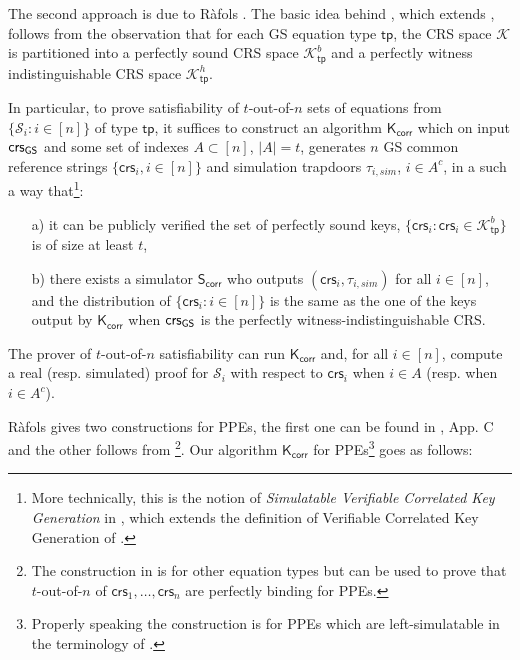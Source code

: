 The second approach is due to R\`afols \cite{TCC:Rafols15}. The basic idea behind \cite{TCC:Rafols15}, which extends \cite{C:GroOstSah06}, follows from the observation that for each GS equation type 
$\mathsf{tp}$,  the CRS space $\mathcal{K}$ is partitioned into a perfectly sound CRS space $\mathcal{K}^b_\mathsf{tp}$ and a perfectly witness indistinguishable CRS space $\mathcal{K}^{h}_\mathsf{tp}$.

In particular, to prove satisfiability of $t$-out-of-$n$ sets of equations from $\{\mathcal{S}_i:i\in[n]\}$ of type $\mathsf{tp}$, it suffices to construct an algorithm $\mathsf{K}_{\mathsf{corr}}$ which on input
$\mathsf{crs}_{{\mathsf{GS}}}$ and some set of indexes $A \subset [n]$, $|A|=t$, generates $n$ GS common reference strings 
$\{\mathsf{crs}_i, i \in [n]\}$ and simulation trapdoors $\tau_{i,sim}$, $i \in A^c$, in a such a way that\footnote{More technically, this is the notion of \textit{Simulatable Verifiable Correlated Key Generation} in \cite{TCC:Rafols15}, which extends the definition of Verifiable Correlated Key Generation of \cite{C:GroOstSah06}.}:
\begin{itemize}
\item[a)] it can be publicly verified the set of perfectly sound keys, 
$\{\mathsf{crs}_i : \mathsf{crs}_i \in \mathcal{K}_{\mathsf{tp}}^{b}\}$ is of size at least $t$,
\item [b)] there exists a simulator $\mathsf{S}_{\mathsf{corr}}$ who outputs $(\mathsf{crs}_i,\tau_{i,sim})$ for all $i \in [n]$, and the distribution of $\{\mathsf{crs}_i : i \in [n]\}$ is the same as the one of the keys  output by $\mathsf{K}_{\mathsf{corr}}$ when $\mathsf{crs}_{{\mathsf{GS}}}$ is the perfectly witness-indistinguishable CRS.
\end{itemize}
The prover of $t$-out-of-$n$ satisfiability can run $\mathsf{K}_{\mathsf{corr}}$ and, for all $i \in [n]$, compute a real (resp. simulated) proof for 
$\mathcal{S}_i$ with respect to $\mathsf{crs}_i$
when $i \in A$ (resp. when $i \in A^c$).

R\`afols gives two constructions for PPEs, the first one can be found in \cite{TCC:Rafols15}, App. C and the other follows from \cite[Sect.~7]{TCC:Rafols15}\footnote{The construction in \cite[Sect.~7]{TCC:Rafols15} is for other equation types but can be used to prove that $t$-out-of-$n$ of $\mathsf{crs}_1,\ldots,\mathsf{crs}_n$ are perfectly binding for PPEs.
}. 
Our algorithm $\mathsf{K}_\mathsf{corr}$ for PPEs\footnote{Properly speaking the construction is for PPEs which are left-simulatable in the terminology of \cite{TCC:Rafols15}.} goes as follows:

